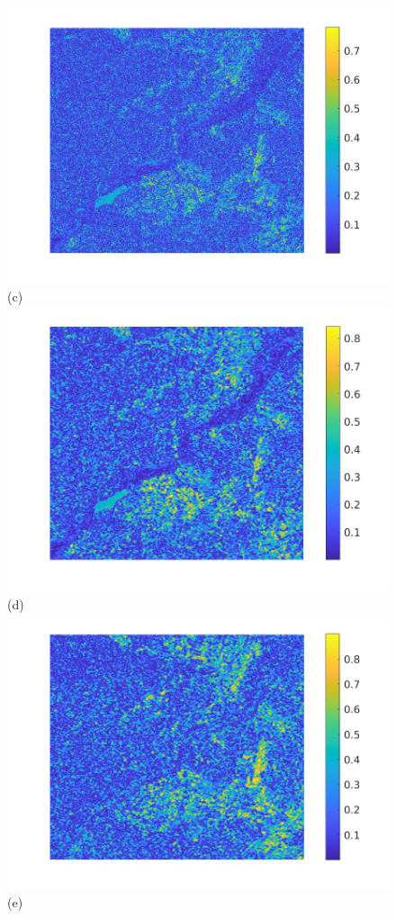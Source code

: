 \documentclass[journal]{IEEEtran}
\begin{document}
\begin{figure}[htp!]
\includegraphics[scale=.12]{../../figs/consecdif_J2_euclid_image_cor}(c)
\includegraphics[scale=.12]{../../figs/consecdif_J3_VV_image_cor}(d)\\ 
\includegraphics[scale=.12]{../../figs/consecdif_J3_VH_image_cor}(e)

\end{figure}
\end{document}
